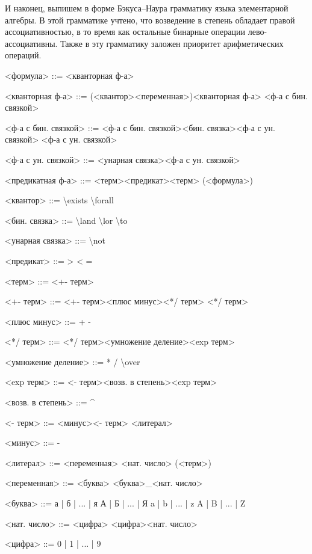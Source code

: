 И наконец, выпишем  в форме Бэкуса--Наура\cite{Sokolov} грамматику языка элементарной алгебры. В этой грамматике учтено, что возведение в степень обладает правой ассоциативностью, в то время как остальные бинарные операции лево-ассоциативны. Также в эту грамматику заложен приоритет арифметических операций.

\begin{grammar}

    <формула> ::= <кванторная ф-а>  

    <кванторная ф-а> ::= (<квантор><переменная>)<кванторная ф-а>
    \alt <ф-а с бин. связкой> 

    <ф-а с бин. связкой> ::= <ф-а с бин. связкой><бин. связка><ф-а с ун. связкой>
    \alt <ф-а с ун. связкой>
    
    <ф-а с ун. связкой> ::= <унарная связка><ф-а с ун. связкой>

    <предикатная ф-а> ::= <терм><предикат><терм>
    \alt (<формула>)

    <квантор> ::= \textbackslash exists
    \alt \textbackslash forall

    <бин. связка> ::= \textbackslash land
    \alt \textbackslash lor
    \alt \textbackslash to

    <унарная связка> ::= \textbackslash not

    <предикат> ::= \textgreater
    \alt \textless
    \alt =

    <терм> ::= <+- терм>

    <+- терм> ::= <+- терм><плюс минус><*/ терм>
    \alt <*/ терм>

    <плюс минус> ::= +
    \alt -

    <*/ терм> ::= <*/ терм><умножение деление><exp терм>

    <умножение деление> ::= *
    \alt /
    \alt \textbackslash over

    <exp терм> ::= <- терм><возв. в степень><exp терм>

    <возв. в степень> ::= \string^

    <- терм> ::= <минус><- терм>
    \alt <литерал>

    <минус> ::= -

    <литерал> ::= <переменная>
    \alt <нат. число>
    \alt (<терм>)

    <переменная> ::= <буква>
    \alt <буква>\_<нат. число>

    <буква> ::= а | б | ... | я 
    \alt А | Б | ... | Я
    \alt a | b | ... | z
    \alt A | B | ... | Z

    <нат. число> ::= <цифра>
    \alt <цифра><нат. число>

    <цифра> ::= 0 | 1 | ... | 9
    
\end{grammar}

